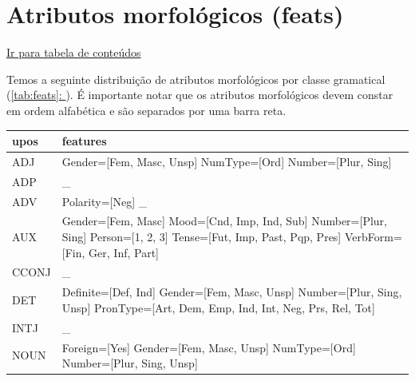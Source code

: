 \documentclass[output=paper,colorlinks,citecolor=brown]{langscibook}
\newcommand*{\fullref}[1]{\hyperref[{#1}]{\autoref*{#1}: \nameref*{#1}}} %
\begin{document}
\chapter{Atributos morfológicos (feats)}\label{sec:feats}

	\hyperlink{toc}{Ir para tabela de conteúdos\\}
	
	Temos a seguinte distribuição de atributos morfológicos por classe gramatical (\fullref{tab:feats}). É importante notar que os atributos morfológicos devem constar em ordem alfabética e são separados por uma barra reta.

	\begin{longtable}{ p{1.5cm} | p{10cm} }
	
		\textbf{upos} & \textbf{features} \\\hline
		ADJ & Gender=[Fem, Masc, Unsp] \newline NumType=[Ord] \newline Number=[Plur, Sing] \newline \\
		ADP & \_ \newline\\
		ADV & Polarity=[Neg] \newline \_ \newline \\
		AUX & Gender=[Fem, Masc] \newline Mood=[Cnd, Imp, Ind, Sub] \newline Number=[Plur, Sing] \newline Person=[1, 2, 3] \newline Tense=[Fut, Imp, Past, Pqp, Pres] \newline VerbForm=[Fin, Ger, Inf, Part] \newline \\
		CCONJ & \_ \newline\\
		DET & Definite=[Def, Ind] \newline Gender=[Fem, Masc, Unsp] \newline Number=[Plur, Sing, Unsp] \newline PronType=[Art, Dem, Emp, Ind, Int, Neg, Prs, Rel, Tot] \newline \\
		INTJ & \_ \newline\\
		NOUN & Foreign=[Yes] \newline Gender=[Fem, Masc, Unsp] \newline NumType=[Ord] \newline Number=[Plur, Sing, Unsp] \newline \\

\end{longtable}
\end{document}

